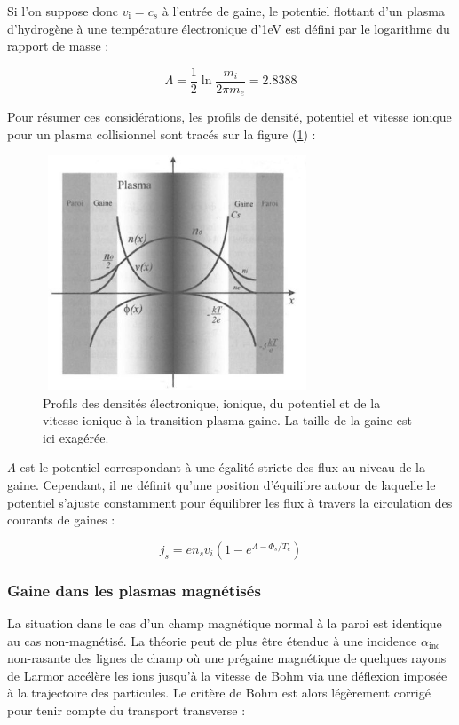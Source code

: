\begin{refsection}
Si l'on suppose donc $v_\text{i}=c_{s}$ à l'entrée de gaine, le potentiel
flottant d'un plasma d'hydrogène à une température électronique d'1eV est
défini par le logarithme du rapport de masse :

\begin{equation}
	\Lambda=\frac{1}{2}\ln{\frac{m_{i}}{2\pi
	m_{e}}}=2.8388
	\end{equation}

Pour résumer ces considérations, les profils de densité,
potentiel et vitesse ionique pour un plasma collisionnel sont tracés sur la
figure (\ref{1-profilesgaine}) :
	
\begin{figure}[htbp]
\centering
\includegraphics[height=70mm,width=80mm]{figures/1-sheathprofiles.jpg}{\caption{Profils
des densités électronique, ionique,
du potentiel et de la vitesse ionique à
la transition plasma-gaine\parencite{Rax}. La taille
de la gaine est ici exagérée.}\label{1-profilesgaine}}
\end{figure}

$\Lambda$ est le potentiel correspondant à une égalité stricte des flux au
niveau de la gaine. Cependant, il ne définit qu'une position
d'équilibre autour de laquelle le potentiel s'ajuste constamment pour
équilibrer les flux à travers la circulation des courants de gaines :

\begin{equation}
	j_{s}=en_{s}v_{i}\left(1-e^{\Lambda-\Phi_{s}/T_{e}}\right)
\end{equation}


\subsubsection{Gaine dans les plasmas magnétisés}
La situation dans le cas d'un champ magnétique normal à la paroi est
identique au cas non-magnétisé. La théorie peut de plus être étendue 
à une incidence $\alpha_\text{inc}$ non-rasante des lignes de champ où une
prégaine magnétique de quelques rayons de Larmor accélère les ions jusqu'à la
vitesse de Bohm via une déflexion imposée à la trajectoire des particules. Le
critère de Bohm est alors légèrement corrigé pour tenir compte du transport transverse
\cite{Stangeby} :


\end{refsection}
